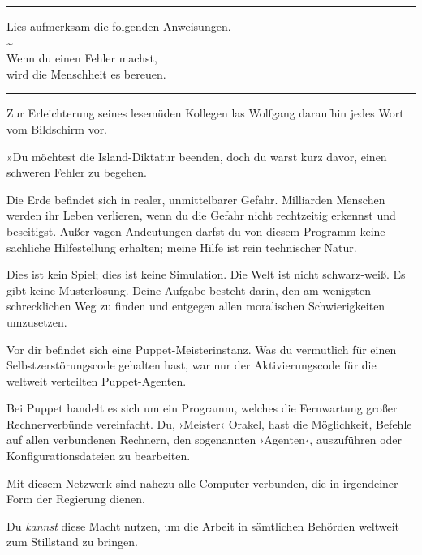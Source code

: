 \noindent \parbox{\textwidth}{ \vspace{3ex} \hrule \vspace{3ex}

    \begin{footnotesize}
    \begin{ttfamily}

\noindent Lies aufmerksam die folgenden Anweisungen.\\
\noindent \textasciitilde{}\\
\noindent Wenn du einen Fehler machst,\\
\noindent wird die Menschheit es bereuen.

    \end{ttfamily}
    \end{footnotesize}

\vspace{3ex} \hrule \vspace{3ex} }

Zur Erleichterung seines lesemüden Kollegen las Wolfgang daraufhin jedes Wort vom Bildschirm vor.

»Du möchtest die Island-Diktatur beenden, doch du warst kurz davor, einen schweren Fehler zu begehen.

Die Erde befindet sich in realer, unmittelbarer Gefahr. Milliarden Menschen werden ihr Leben verlieren, wenn du die Gefahr nicht rechtzeitig erkennst und beseitigst. Außer vagen Andeutungen darfst du von diesem Programm keine sachliche Hilfestellung erhalten; meine Hilfe ist rein technischer Natur.

Dies ist kein Spiel; dies ist keine Simulation. Die Welt ist nicht schwarz-weiß. Es gibt keine Musterlösung. Deine Aufgabe besteht darin, den am wenigsten schrecklichen Weg zu finden und entgegen allen moralischen Schwierigkeiten umzusetzen.

Vor dir befindet sich eine Puppet-Meisterinstanz. Was du vermutlich für einen Selbstzerstörungscode gehalten hast, war nur der Aktivierungscode für die weltweit verteilten Puppet-Agenten.

Bei Puppet handelt es sich um ein Programm, welches die Fernwartung großer Rechnerverbünde vereinfacht. Du, ›Meister‹ Orakel, hast die Möglichkeit, Befehle auf allen verbundenen Rechnern, den sogenannten ›Agenten‹, auszuführen oder Konfigurationsdateien zu bearbeiten.

Mit diesem Netzwerk sind nahezu alle Computer verbunden, die in irgendeiner Form der Regierung dienen.

Du \emph{kannst} diese Macht nutzen, um die Arbeit in sämtlichen Behörden weltweit zum Stillstand zu bringen.

